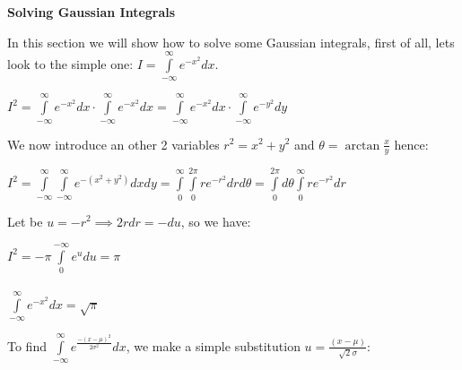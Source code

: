 \documentclass[paper=9in:6in,pagesize=pdftex,headinclude=on,footinclude=on,10pt,bibtotoc,pointlessnumbers,normalheadings,DIV=9,twoside=false]{scrbook}
\begin{document}
\date{}


\begin{large} 
 \textbf{Solving Gaussian Integrals \\}
\end{large} 

\begin{text}
In this section we will show how to solve some Gaussian integrals, first of all, lets look to the simple one:  $I = \int\limits_{-\infty}^{\infty} e^{-x^2} dx$. \\
\end{text}

\begin{center}
    $I^2 = \int\limits_{-\infty}^{\infty} e^{-x^2} dx \cdot \int\limits_{-\infty}^{\infty} e^{-x^2} dx = \int\limits_{-\infty}^{\infty} e^{-x^2} dx \cdot \int\limits_{-\infty}^{\infty} e^{-y^2} dy$
\end{center}

\begin{text}
We now introduce an other 2 variables $r^2=x^2+y^2$ and $\theta = \arctan \frac{x}{y}$ hence:
\end{text}

\begin{center}
    $I^2 = \int\limits_{-\infty}^{\infty} \int\limits_{-\infty}^{\infty} e^{-(x^2+y^2)} dxdy = \int\limits_{0}^{\infty}\int\limits_{0}^{2\pi} r e^{-r^2}drd\theta = \int\limits_{0}^{2\pi} d\theta \int\limits_{0}^{\infty} re^{-r^2} dr$
\end{center}


\begin{text}
Let be $u=-r^2 \implies 2rdr = -du$, so we have:
\end{text}

\begin{center}
    $I^2 = -\pi \int\limits_{0}^{-\infty} e^u du = \pi$ \\
    
    \ \\
    
   $ \int\limits_{-\infty}^{\infty} e^{-x^2} dx = \sqrt{\pi}$ \\
\end{center}

\begin{text}

To find $\int\limits_{-\infty}^{\infty} e^{\frac{-(x-\mu)^2}{2\sigma^2}}dx$, we make a simple substitution $u = \frac{(x-\mu)}{\sqrt{2}\sigma}$: \\

\end{text}
\end{document}
